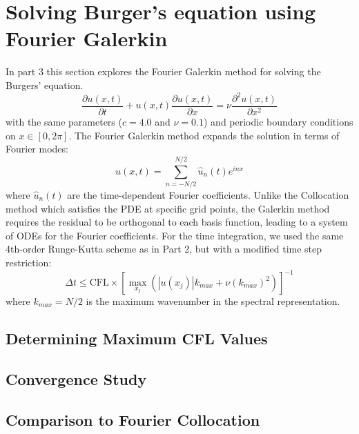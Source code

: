 \section{Solving Burger's equation using Fourier Galerkin}
In part 3  this section explores the Fourier Galerkin method for solving the Burgers' equation.
\begin{equation}
	\frac{\partial u(x, t)}{\partial t} + u(x, t) \frac{\partial u(x, t)}{\partial x} = \nu \frac{\partial^2 u(x, t)}{\partial x^2}
\end{equation}
with the same parameters ($c = 4.0$ and $\nu = 0.1$) and periodic boundary conditions on $x \in [0, 2\pi]$.\newline
The Fourier Galerkin method expands the solution in terms of Fourier modes:
\begin{equation}
	u(x, t) = \sum_{n=-N/2}^{N/2} \hat{u}_n(t)e^{inx}
\end{equation}
where $\hat{u}_n(t)$ are the time-dependent Fourier coefficients. Unlike the Collocation method which satisfies the PDE at specific grid points, the Galerkin method requires the residual to be orthogonal to each basis function, leading to a system of ODEs for the Fourier coefficients.
For the time integration, we used the same 4th-order Runge-Kutta scheme as in Part 2, but with a modified time step restriction:
\begin{equation}
	\Delta t \leq \text{CFL} \times \left[ \max_{x_j} \left(|u(x_j)| k_{max} + \nu (k_{max})^2  \right)\right]^{-1}
\end{equation}
where $k_{max} = N/2$ is the maximum wavenumber in the spectral representation.

\subsection{Determining Maximum CFL Values}

\subsection{Convergence Study}

\subsection{Comparison to Fourier Collocation}
